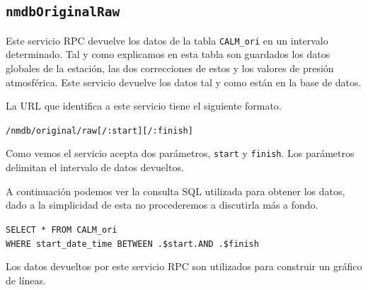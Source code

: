 	\subsection{\texttt{nmdbOriginalRaw}}
		Este servicio RPC devuelve los datos de la tabla \texttt{CALM\_ori} en un intervalo determinado. Tal y como explicamos en esta tabla
		son guardados los datos globales de la estación, las dos correcciones de estos y los valores de presión atmosférica. Este servicio
		devuelve los datos tal y como están en la base de datos. 
	  	\par
		La URL que identifica a este servicio tiene el siguiente formato.
	  		\begin{center} \texttt{/nmdb/original/raw[/:start][/:finish]}  \end{center} 
		Como vemos el servicio acepta dos parámetros, \texttt{start} y \texttt{finish}. Los parámetros delimitan el intervalo de datos
		devueltos.
		\par
		A continuación podemos ver la consulta SQL utilizada para obtener los datos, dado a la simplicidad de esta no procederemos a discutirla
		más a fondo.
	  		\begin{center} \texttt{SELECT * FROM CALM\_ori 
			  		\\	WHERE start\_date\_time BETWEEN \cc.\$start.\cc AND \cc.\$finish\cc}
			\end{center} 
		Los datos devueltos por este servicio RPC son utilizados para construir un gráfico de líneas.

